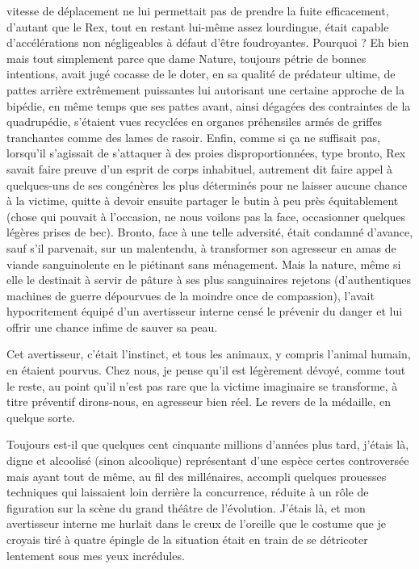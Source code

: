 vitesse de déplacement ne lui permettait pas de prendre la fuite efficacement, d’autant que le Rex, tout en restant lui-même assez lourdingue, était capable d’accélérations non négligeables à défaut d’être foudroyantes. Pourquoi ? Eh bien mais tout simplement parce que dame Nature, toujours pétrie de bonnes intentions, avait jugé cocasse de le doter, en sa qualité de prédateur ultime, de pattes arrière extrêmement puissantes lui autorisant une certaine approche de la bipédie, en même temps que ses pattes avant, ainsi dégagées des contraintes de la quadrupédie, s’étaient vues recyclées en organes préhensiles armés de griffes tranchantes comme des lames de rasoir. Enfin, comme si ça ne suffisait pas, lorsqu’il s’agissait de s’attaquer à des proies disproportionnées, type bronto, Rex savait faire preuve d’un esprit de corps inhabituel, autrement dit faire appel à quelques-uns de ses congénères les plus déterminés pour ne laisser aucune chance à la victime, quitte à devoir ensuite partager le butin à peu près équitablement (chose qui pouvait à l’occasion, ne nous voilons pas la face, occasionner quelques légères prises de bec). Bronto, face à une telle adversité, était condamné d’avance, sauf s’il parvenait, sur un malentendu, à transformer son agresseur en amas de viande sanguinolente en le piétinant sans ménagement. Mais la nature, même si elle le destinait à servir de pâture à ses plus sanguinaires rejetons (d’authentiques machines de guerre dépourvues de la moindre once de compassion), l’avait hypocritement équipé d’un avertisseur interne censé le prévenir du danger et lui offrir une chance infime de sauver sa peau.

Cet avertisseur, c’était l’instinct, et tous les animaux, y compris l’animal humain, en étaient pourvus. Chez nous, je pense qu’il est légèrement dévoyé, comme tout le reste, au point qu’il n’est pas rare que la victime imaginaire se transforme, à titre préventif dirons-nous, en agresseur bien réel. Le revers de la médaille, en quelque sorte.

Toujours est-il que quelques cent cinquante millions d’années plus tard, j’étais là, digne et alcoolisé (sinon alcoolique) représentant d’une espèce certes controversée mais ayant tout de même, au fil des millénaires, accompli quelques prouesses techniques qui laissaient loin derrière la concurrence, réduite à un rôle de figuration sur la scène du grand théâtre de l’évolution. J’étais là, et mon avertisseur interne me hurlait dans le creux de l’oreille que le costume que je croyais tiré à quatre épingle de la situation était en train de se détricoter lentement sous mes yeux incrédules.

